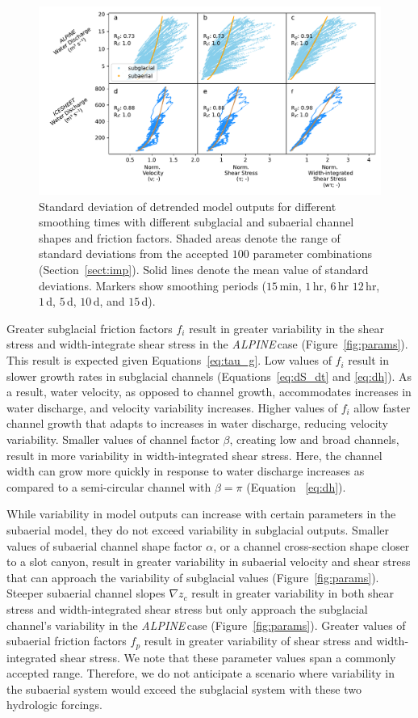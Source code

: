\documentclass[tc, manuscript]{copernicus}
\newcommand{\alpine}{\textit{ALPINE}\,}
\begin{document}
\begin{figure}[hbt!]
  \centering
  \includegraphics[width=0.7\linewidth]{Fig3.pdf}
  \caption{Standard deviation of detrended model outputs for different smoothing times with different subglacial and subaerial channel shapes and friction factors.
    Shaded areas denote the range of standard deviations from the accepted $100$ parameter combinations (Section~\ref{sect:imp}).
    Solid lines denote the mean value of standard deviations.
    Markers show smoothing periods ($15$\,\unit{min}, $1$\,\unit{hr}, $6$\,\unit{hr} $12$\,\unit{hr}, $1$\,\unit{d}, $5$\,\unit{d}, $10$\,\unit{d}, and $15$\,\unit{d}).
  }
  \label{fig:multi_run}
\end{figure}

Greater subglacial friction factors $f_i$ result in greater variability in the shear stress and width-integrate shear stress in the \alpine case (Figure~\ref{fig:params}).
This result is expected given Equations~\ref{eq:tau_g}.
Low values of $f_i$ result in slower growth rates in subglacial channels (Equations~\ref{eq:dS_dt} and \ref{eq:dh}).
As a result, water velocity, as opposed to channel growth, accommodates increases in water discharge, and velocity variability increases.
Higher values of $f_i$ allow faster channel growth that adapts to increases in water discharge, reducing velocity variability.
Smaller values of channel factor $\beta$, creating low and broad channels, result in more variability in width-integrated shear stress.
Here, the channel width can grow more quickly in response to water discharge increases as compared to a semi-circular channel with $\beta = \pi$ (Equation~ \ref{eq:dh}).

While variability in model outputs can increase with certain parameters in the subaerial model, they do not exceed variability in subglacial outputs.
Smaller values of subaerial channel shape factor $\alpha$, or a channel cross-section shape closer to a slot canyon, result in greater variability in subaerial velocity and shear stress that can approach the variability of subglacial values (Figure~\ref{fig:params}).
Steeper subaerial channel slopes $\nabla z_c$ result in greater variability in both shear stress and width-integrated shear stress but only approach the subglacial channel's variability in the \alpine case (Figure~\ref{fig:params}). 
Greater values of subaerial friction factors $f_p$ result in greater variability of shear stress and width-integrated shear stress. 
We note that these parameter values span a commonly accepted range.
Therefore, we do not anticipate a scenario where variability in the subaerial system would exceed the subglacial system with these two hydrologic forcings.
\end{document}
